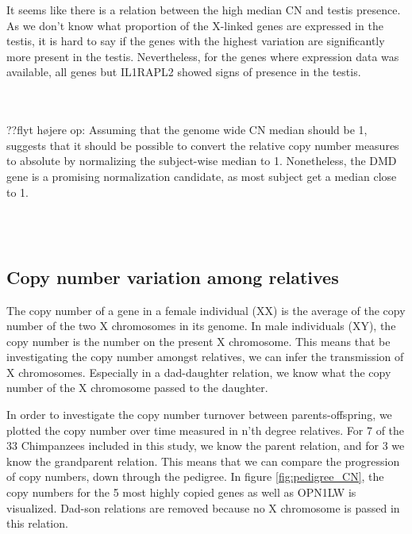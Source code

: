 \noindent It seems like there is a relation between the high median CN and testis presence. As we don't know what proportion of the X-linked genes are expressed in the testis, it is hard to say if the genes with the highest variation are significantly more present in the testis. Nevertheless, for the genes where expression data was available, all genes but IL1RAPL2 showed signs of presence in the testis.






\\
\\
\noindent ??flyt højere op: Assuming that the genome wide CN median should be 1, suggests that it should be possible to convert the relative copy number measures to absolute by normalizing the subject-wise median to 1. Nonetheless, the DMD gene is a promising normalization candidate, as most subject get a median close to 1.

\\
\\
\subsection*{Copy number variation among relatives}
The copy number of a gene in a female individual (XX) is the average of the copy number of the two X chromosomes in its genome. In male individuals (XY), the copy number is the number on the present X chromosome. This means that be investigating the copy number amongst relatives, we can infer the transmission of X chromosomes. Especially in a dad-daughter relation, we know what the copy number of the X chromosome passed to the daughter.

In order to investigate the copy number turnover between parents-offspring, we plotted the copy number over time measured in n'th degree relatives. For 7 of the 33 Chimpanzees included in this study, we know the parent relation, and for 3 we know the grandparent relation. This means that we can compare the progression of copy numbers, down through the pedigree. In figure \ref{fig:pedigree_CN}, the copy numbers for the 5 most highly copied genes as well as OPN1LW is visualized. Dad-son relations are removed because no X chromosome is passed in this relation.

